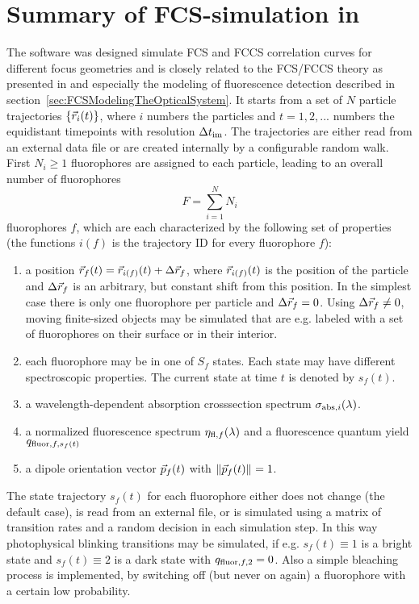 
\chapter{Summary of FCS-simulation in \df}
\label{sec:SummaryOfDf}

The software \df was designed simulate FCS and FCCS correlation curves for different focus geometries and is closely related to the FCS/FCCS theory as presented in \cite{KRIEGERPHD2014} and especially the modeling of fluorescence detection described in section~\ref{sec:FCSModelingTheOpticalSystem}. It starts from a set of $N$ particle trajectories $\{\vec{r}_i(t)\}$, where $i$ numbers the particles and $t=1,2,...$ numbers the equidistant timepoints with resolution $\Delta t_{\text{im}}$. The trajectories are either read from an external data file or are created internally by a configurable random walk. First $N_i\geq 1$ fluorophores are assigned to each particle, leading to an overall number of fluorophores \[  F=\sum\limits_{i=1}^NN_i  \] fluorophores $f$, which are each  characterized by the following set of properties (the functions $i(f)$ is the trajectory ID for every fluorophore $f$):
\begin{enumerate}
	\item a position $\vec{r}_f(t)=\vec{r}_{i(f)}(t)+\Delta\vec{r}_{f}$, where $\vec{r}_{i(f)}(t)$ is the position of the particle and $\Delta\vec{r}_f$ is an arbitrary, but constant shift from this position. In the simplest case there is only one fluorophore per particle and $\Delta\vec{r}_f=0$. Using $\Delta\vec{r}_f\neq0$, moving finite-sized objects may be simulated that are e.g. labeled with a set of fluorophores on their surface or in their interior.
  \item each fluorophore may be in one of $S_f$ states. Each state may have different spectroscopic properties. The current state at time $t$ is denoted by $s_f(t)$. 
  \item a wavelength-dependent absorption crosssection spectrum $\sigma_{{\text{abs}},i}(\lambda)$.
  \item a normalized fluorescence spectrum $\eta_{{\text{fl}},f}(\lambda)$ and a fluorescence quantum yield $q_{{\text{fluor}},f,s_f(t)}$
  \item a dipole orientation vector $\vec{p}_f(t)$ with $\|\vec{p}_f(t)\|_{}=1$.
\end{enumerate}
The state trajectory $s_f(t)$ for each fluorophore either does not change (the default case), is read from an external file, or is simulated using a matrix of transition rates and a random decision in each simulation step. In this way photophysical blinking transitions may be simulated, if e.g. $s_f(t)\equiv1$ is a bright state and $s_f(t)\equiv2$ is a dark state with $q_{{\text{fluor}},f,2}=0$. Also a simple bleaching process is implemented, by switching off (but never on again) a fluorophore with a certain low probability.

